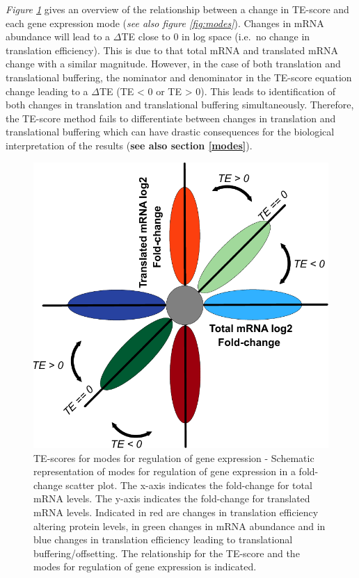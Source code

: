 \documentclass[12pt,openany]{book}
\begin{document}
\emph{Figure \ref{fig:TE}} gives an overview of the relationship between
a change in TE-score and each gene expression mode (\emph{see also
figure \ref{fig:modes}}). Changes in mRNA abundance will lead to a
\(\varDelta\)TE close to 0 in log space (i.e.~no change in translation
efficiency). This is due to that total mRNA and translated mRNA change
with a similar magnitude. However, in the case of both translation and
translational buffering, the nominator and denominator in the TE-score
equation change leading to a \(\varDelta\)TE (TE \textless{} 0 or TE
\textgreater{} 0). This leads to identification of both changes in
translation and translational buffering simultaneously. Therefore, the
TE-score method fails to differentiate between changes in translation
and translational buffering which can have drastic consequences for the
biological interpretation of the results (\textbf{see also section
\ref{modes}}). \clearpage

\begin{figure}
  \includegraphics{./figures/geneModes_TE.pdf}
  \caption{TE-scores for modes for regulation of gene expression -  Schematic representation of modes for regulation of gene expression in a fold-change scatter plot. The x-axis indicates the fold-change for total mRNA levels. The y-axis indicates the fold-change for translated mRNA levels. Indicated in red are changes in translation efficiency altering protein levels, in green changes in mRNA abundance and in blue changes in translation efficiency leading to translational buffering/offsetting. The relationship for the TE-score and the modes for regulation of gene expression is indicated. \label{fig:TE}}
\end{figure}
\end{document}
